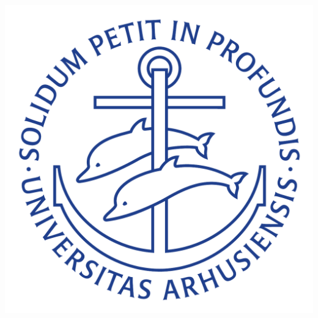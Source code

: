 \documentclass[
10pt, %
b5paper, %
twoside, %
openright  %
]{book}  %
\begin{document}
\begin{minipage}[t]{0.1\paperwidth}
	\vspace*{15ex}  %
	\includegraphics[width=0.1\paperwidth]{figs/logos/ausegl_blaa.pdf}
\end{minipage}
\restoregeometry


\cleardoublepage
\begin{dedication}






\end{dedication}
\cleardoublepage
{}  %
\end{document}
